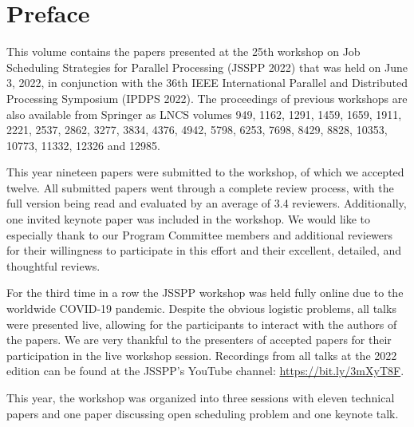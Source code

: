 \documentclass{llncs}
\begin{document}
%
\frontmatter          %
%
\pagestyle{headings}  %
%
\chapter*{Preface}
%
This volume contains the papers presented at the 25th workshop on Job
Scheduling Strategies for Parallel Processing (JSSPP 2022) that was held on June 3, 2022, in conjunction
with the 36th IEEE International Parallel and Distributed Processing Symposium (IPDPS 2022).
The proceedings of previous workshops are also available from Springer as LNCS
volumes 949, 1162, 1291, 1459, 1659, 1911, 2221, 2537, 2862, 3277, 3834, 4376,
4942, 5798, 6253, 7698, 8429, 8828, 10353, 10773, 11332, 12326 and 12985. 

This year nineteen papers were submitted to the workshop, of which we accepted twelve. All submitted papers 
went through a complete review process, with the full version being read and evaluated by an average 
of 3.4 reviewers. Additionally, one invited keynote paper was included in the workshop. We would like to
especially thank to our Program Committee members and additional reviewers for their willingness to 
participate in this effort and their excellent, detailed, and thoughtful reviews. 

For the third time in a row the JSSPP workshop was held fully online due to the worldwide COVID-19 pandemic.
Despite the obvious logistic problems, all talks were presented live, allowing for the participants to 
interact with the authors of the papers. We are very thankful to the presenters of accepted papers for 
their participation in the live workshop session.
Recordings from all talks at the 2022 edition can be found at the JSSPP's YouTube channel: \url{https://bit.ly/3mXyT8F}.

This year, the workshop was organized into three sessions with eleven technical papers and one paper 
discussing open scheduling problem and one keynote talk.
\end{document}

